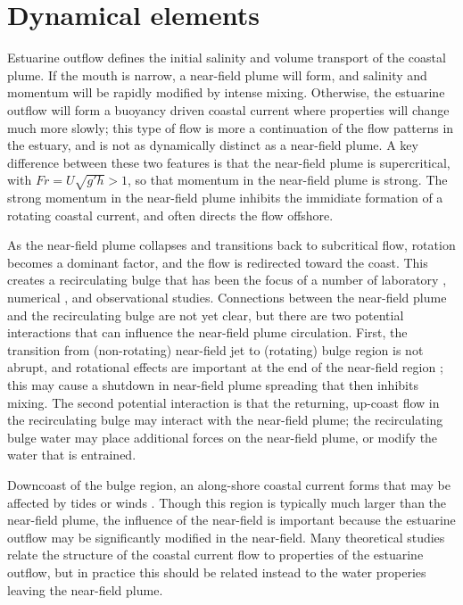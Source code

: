 \documentclass[12pt]{article}
\begin{document}
\section{Dynamical elements}

Estuarine outflow defines the initial salinity and volume transport of the coastal plume.  If the mouth is narrow, a near-field plume will form, and salinity and momentum will be rapidly modified by intense mixing. Otherwise, the estuarine outflow will form a buoyancy driven coastal current where properties will change much more slowly; this type of flow is more a continuation of the flow patterns in the estuary, and is not as dynamically distinct as a near-field plume. A key difference between these two features is that the near-field plume is supercritical, with $Fr = U \sqrt{g' h} > 1$, so that momentum in the near-field plume is strong. The strong momentum in the near-field plume inhibits the immidiate formation of a rotating coastal current, and often directs the flow offshore. 

As the near-field plume collapses and transitions back to subcritical flow, rotation becomes a dominant factor, and the flow is redirected toward the coast. This creates a recirculating bulge that has been the focus of a number of laboratory \citep{avicola.huq:03b,horner-devine.ea:06}, numerical \citep{fong.geyer:02,isobe:05}, and observational \citep{horner-devine:09,kudela.ea:10} studies. Connections between the near-field plume and the recirculating bulge are not yet clear, but there are two potential interactions that can influence the near-field plume circulation. First, the transition from (non-rotating) near-field jet to (rotating) bulge region is not abrupt, and rotational effects are important at the end of the near-field region \citep{cole.dissertation}; this may cause a shutdown in near-field plume spreading that then inhibits mixing. The second potential interaction is that the returning, up-coast flow in the recirculating bulge may interact with the near-field plume; the recirculating bulge water may place additional forces on the near-field plume, or modify the water that is entrained.

Downcoast of the bulge region, an along-shore coastal current forms \citep{} that may be affected by tides \citep{deboer.ea:08,pritchard.huntley:06} or winds \citep{fong.geyer:01,hetland:05,lentz:04,jurisa.chant:13}. Though this region is typically much larger than the near-field plume, the influence of the near-field is important because the estuarine outflow may be significantly modified in the near-field. Many theoretical studies relate the structure of the coastal current flow to properties of the estuarine outflow, but in practice this should be related instead to the water properies leaving the near-field plume.
\end{document}
